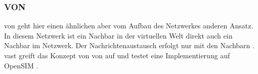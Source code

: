 \subsubsection*{VON}
\label{chap:related:von}
\ac{von} geht hier einen ähnlichen aber vom Aufbau des Netzwerkes anderen Ansatz. In diesem Netzwerk ist ein Nachbar in der virtuellen Welt direkt auch ein Nachbar im Netzwerk. Der Nachrichtenaustausch erfolgt nur mit den Nachbarn \cite{Hu2006VON}. \ac{vast} \cite{Backhaus2007Voronoibased} greift das Konzept von \ac{von} auf und testet eine Implementierung auf OpenSIM \cite{Baumgart2007OverSim}.
